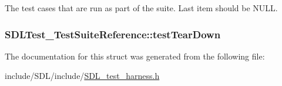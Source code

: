 The test cases that are run as part of the suite. Last item should be N\-U\-L\-L. \hypertarget{struct_s_d_l_test___test_suite_reference_ad66abaf20653fd7361d28c69f88ac702}{
\subsubsection[{test\-Tear\-Down}]{ S\-D\-L\-Test\-\_\-\-Test\-Suite\-Reference\-::test\-Tear\-Down}}\label{struct_s_d_l_test___test_suite_reference_ad66abaf20653fd7361d28c69f88ac702}


The documentation for this struct was generated from the following file\-:\begin{DoxyCompactItemize}
\item 
include/\-S\-D\-L/include/\hyperlink{_s_d_l__test__harness_8h}{S\-D\-L\-\_\-test\-\_\-harness.\-h}\end{DoxyCompactItemize}
